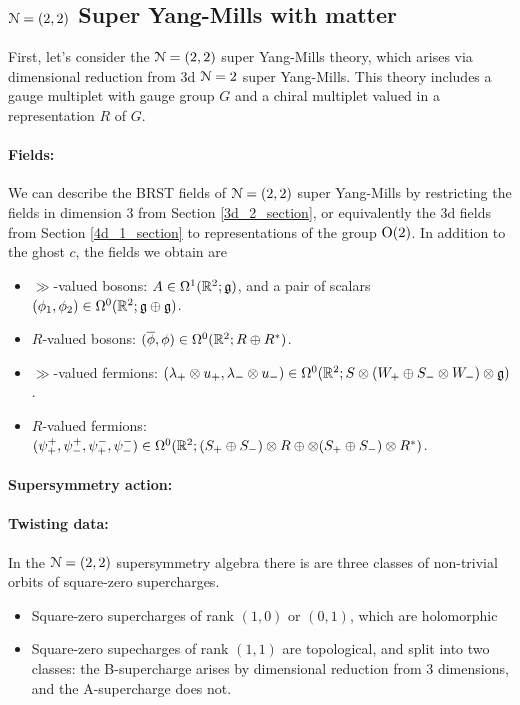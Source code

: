 \documentclass[10pt, oneside]{article}
\begin{document}
\subsection{\texorpdfstring{$\mathcal N=(2,2)$}{N=(2,2)} Super Yang-Mills with matter} \label{sec:2d(2,2)}
First, let's consider the $\mathcal{N}=(2,2)$ super Yang-Mills theory, which arises via dimensional reduction from 3d $\mathcal{N}=2$ super Yang-Mills.  This theory includes a gauge multiplet with gauge group $G$ and a chiral multiplet valued in a representation $R$ of $G$.

\vspace{-10pt}
\paragraph{Fields:} We can describe the BRST fields of $\mathcal{N}=(2,2)$ super Yang-Mills by restricting the fields in dimension 3 from Section \ref{3d_2_section}, or equivalently the 3d fields from Section \ref{4d_1_section} to representations of the group $\mathrm{O}(2)$.  In addition to the ghost $c$, the fields we obtain are
\begin{itemize}
 \item $\gg$-valued bosons: $A \in \Omega^1(\mathbb R^2; \mathfrak{g})$, and a pair of scalars $(\phi_1,\phi_2) \in \Omega^0(\mathbb R^2; \mathfrak{g} \oplus \mathfrak{g})$.
 \item $R$-valued bosons: $(\overline{\phi}, \phi) \in \Omega^0(\mathbb R^2 ; R \oplus R^*)$.
 \item $\gg$-valued fermions: $(\lambda_+ \otimes u_+,\lambda_- \otimes u_-) \in \Omega^0(\mathbb R^2 ; S \otimes (W_+ \oplus S_- \otimes W_-) \otimes \mathfrak{g})$.
 \item $R$-valued fermions: $(\psi^+_+,\psi^+_-, \psi^-_+, \psi^-_-) \in \Omega^0(\mathbb R^2 ; (S_+ \oplus S_-) \otimes R \oplus \otimes (S_+ \oplus S_-) \otimes R^*)$.
\end{itemize}

\vspace{-10pt}
\paragraph{Supersymmetry action:} 

\vspace{-10pt}
\paragraph{Twisting data:}
In the $\mathcal{N}=(2,2)$ supersymmetry algebra there is are three classes of non-trivial orbits of square-zero supercharges.  
\begin{itemize}
 \item Square-zero supercharges of rank $(1,0)$ or $(0,1)$, which are holomorphic
 \item Square-zero supecharges of rank $(1,1)$ are topological, and split into two classes: the B-supercharge arises by dimensional reduction from 3 dimensions, and the A-supercharge does not.
\end{itemize}
\end{document}
